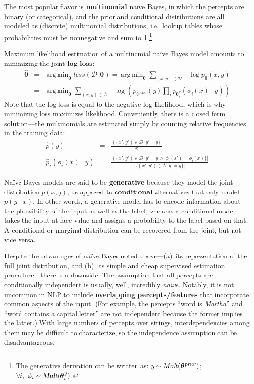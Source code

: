 \documentclass[11pt,letterpaper]{article}
\DeclareMathOperator*{\argmin}{arg\,min}
\begin{document}
The most popular flavor is \textbf{multinomial} na\"{i}ve Bayes, in which the 
percepts are binary (or categorical), and 
the prior and conditional distributions are all modeled as (discrete) multinomial distributions, i.e.~lookup tables 
whose probabilities must be nonnegative and sum to 1.\footnote{The generative derivation can be written as: 
$y \sim \textsl{Mult}(\boldsymbol{\theta}^{\text{prior}})$; $\forall i,~\phi_i \sim \textsl{Mult}(\boldsymbol{\theta}^y_i)$.}

Maximum likelihood estimation of a multinomial na\"{i}ve Bayes model amounts to minimizing the joint \textbf{log loss}:
\begin{eqnarray}
\hat{\boldsymbol{\theta}} &=& \argmin_{\boldsymbol{\theta}} \textit{loss}(\mathcal{D}; \boldsymbol{\theta})
=   \argmin_{\boldsymbol{\theta}}{\sum_{(x,y) \in \mathcal{D}}{-\log{p_{\boldsymbol{\theta}}(x,y)}}} \\
&=& \argmin_{\boldsymbol{\theta}}{\sum_{(x,y) \in \mathcal{D}}{-\log{\left(p_{\boldsymbol{\theta}^{\text{prior}}}(y)\prod_i{p_{\boldsymbol{\theta}^y_i}(\phi_i(x) \mid y)}\right)}}}
\end{eqnarray}
Note that the log loss is equal to the negative log likelihood, which is why minimizing loss maximizes likelihood.
Conveniently, there is a closed form solution---the multinomials are estimated simply by 
counting relative frequencies in the training data:
\begin{eqnarray}
\hat{p}(y) &=& \frac{|\{(x',y')\in\mathcal{D}: y'=y\}|}{|\mathcal{D}|} \\
\hat{p}_i(\phi_i(x) \mid y) &=& \frac{|\{(x',y')\in\mathcal{D}: y'=y~\wedge~\phi_i(x')=\phi_i(x)\}|}{|\{(x',y')\in\mathcal{D}: y'=y\}|}
\end{eqnarray}

Na\"{i}ve Bayes models are said to be \textbf{generative} because they model 
the joint distribution $p(x,y)$, as opposed to \textbf{conditional} alternatives that only model $p(y \mid x)$.
In other words, a generative model has to encode information about the plausibility of the input as well as the label, 
whereas a conditional model takes the input at face value and assigns a probability to the label based on that.
A conditional or marginal distribution can be recovered from the joint, but not vice versa.

Despite the advantages of na\"{i}ve Bayes noted above---(a)~its representation of the full joint distribution, 
and (b)~its simple and cheap supervised estimation procedure---there is a downside. 
The assumption that all percepts are conditionally independent is usually, well, incredibly {\em na\"{i}ve}. 
Notably, it is not uncommon in NLP to include \textbf{overlapping percepts\slash features} 
that incorporate common aspects of the input. (For example, the percepts ``word is \textit{Martha}'' 
and ``word contains a capital letter'' are not independent because the former implies the latter.)
With large numbers of percepts over strings, interdependencies among them may be difficult to 
characterize, so the independence assumption can be disadvantageous. 
\end{document}

